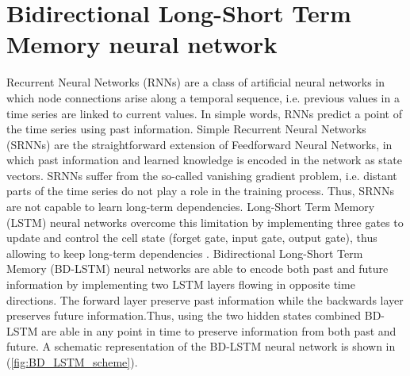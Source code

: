 \section{Bidirectional Long-Short Term Memory neural network}

Recurrent Neural Networks (RNNs) are a class of artificial neural networks
in which node connections arise along a temporal sequence, i.e. previous values
in a time series are linked to current values. In simple words, RNNs predict a
point of the time series using past information. Simple Recurrent Neural
Networks (SRNNs) are the straightforward extension of Feedforward Neural
Networks, in which past information and learned knowledge is encoded in the
network as state vectors. SRNNs suffer from the so-called vanishing gradient
problem, i.e. distant parts of the time series do not play a role in the
training process. Thus, SRNNs are not capable to learn long-term dependencies.
Long-Short Term Memory (LSTM) neural networks overcome this limitation by
implementing three gates to update and control the cell state (forget gate,
input gate, output gate), thus allowing to keep long-term dependencies
\cite{LSTM_NN}. Bidirectional Long-Short Term Memory (BD-LSTM) neural networks
are able to encode both past and future information by implementing two LSTM
layers flowing in opposite time directions. The forward layer preserve past
information while the backwards layer preserves future information.Thus, using
the two hidden states combined BD-LSTM are able in any point in time to
preserve information from both past and future. A schematic representation of
the BD-LSTM neural network is shown in (\cref{fig:BD_LSTM_scheme}).

